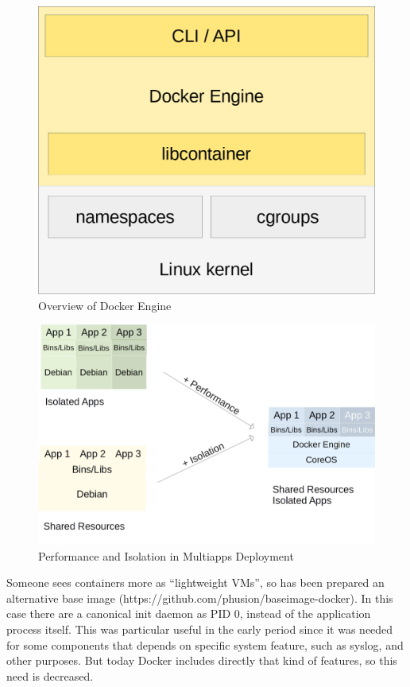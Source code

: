 \begin{figure}[htbp]
\centering
\includegraphics{media/ch3-docker.png}
\caption{Overview of Docker Engine}
\end{figure}

\begin{figure}[htbp]
\centering
\includegraphics{media/ch3-docker_multiapps.png}
\caption{Performance and Isolation in Multiapps Deployment}
\end{figure}

Someone sees containers more as ``lightweight VMs'', so has been
prepared an alternative base image
(https://github.com/phusion/baseimage-docker). In this case there are a
canonical init daemon as PID 0, instead of the application process
itself. This was particular useful in the early period since it was
needed for some components that depends on specific system feature, such
as syslog, and other purposes. But today Docker includes directly that
kind of features, so this need is decreased.

